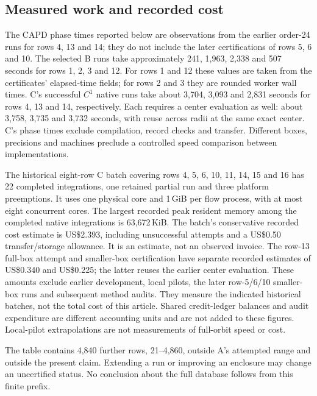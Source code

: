 \documentclass[10pt,a4paper]{article}
\theoremstyle{remark}
\begin{document}
\subsection{Measured work and recorded cost}
The CAPD phase times reported below are observations from the earlier
order-24 runs for rows 4, 13 and 14; they do not include the later
certifications of rows 5, 6 and 10.
The selected B runs take approximately 241, 1,963, 2,338 and 507 seconds
for rows 1, 2, 3 and 12. For rows 1 and 12 these values are taken from
the certificates' elapsed-time fields; for rows 2 and 3 they are rounded
worker wall times. C's successful $C^1$ native runs take about
3,704, 3,093 and 2,831 seconds for rows 4, 13 and 14, respectively.
Each requires a center evaluation as well: about 3,758, 3,735 and
3,732 seconds, with reuse across radii at the same exact center.
C's phase times exclude compilation, record checks and transfer.
Different boxes, precisions and machines preclude a controlled speed
comparison between implementations.

The historical eight-row C batch covering rows 4, 5, 6, 10, 11, 14, 15 and 16 has
22 completed integrations, one retained partial run and three platform
preemptions. It uses one physical core and 1\,GiB per flow process, with
at most eight concurrent cores. The largest recorded peak resident
memory among the completed native integrations is 63,672\,KiB. The
batch's conservative recorded cost estimate is US\$2.393, including
unsuccessful attempts and a US\$0.50 transfer/storage allowance. It is
an estimate, not an observed invoice. The row-13 full-box attempt and
smaller-box certification have separate recorded estimates of
US\$0.340 and US\$0.225; the latter reuses the earlier center evaluation.
These amounts exclude earlier development, local pilots, the later
row-5/6/10 smaller-box runs and subsequent method audits. They measure
the indicated historical batches, not the total cost of this article.
Shared credit-ledger balances and audit expenditure are different
accounting units and are not added to these figures. Local-pilot
extrapolations are not measurements of full-orbit speed or cost.

The table contains 4,840 further rows, 21--4,860, outside A's attempted
range and outside the present claim. Extending a run or improving an
enclosure may change an uncertified status. No conclusion about the
full database follows from this finite prefix.
\end{document}

